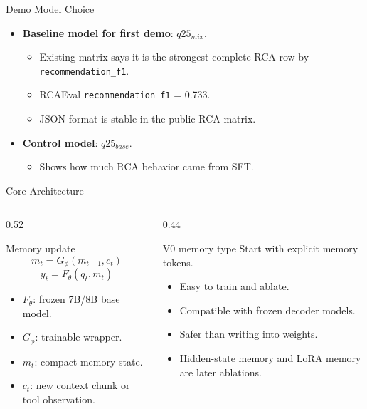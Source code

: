 \begin{frame}{Demo Model Choice}
  \begin{itemize}
    \item \textbf{Baseline model for first demo}: $q25_{mix}$.
      \begin{itemize}
        \item Existing matrix says it is the strongest complete RCA row by \texttt{recommendation\_f1}.
        \item RCAEval \texttt{recommendation\_f1} = 0.733.
        \item JSON format is stable in the public RCA matrix.
      \end{itemize}
    \item \textbf{Control model}: $q25_{base}$.
      \begin{itemize}
        \item Shows how much RCA behavior came from SFT.
      \end{itemize}
  \end{itemize}
\end{frame}

\begin{frame}{Core Architecture}
  \begin{columns}[T]
    \begin{column}{0.52\textwidth}
      \begin{block}{Memory update}
        \[
          m_t = G_\phi(m_{t-1}, c_t)
        \]
        \[
          y_t = F_\theta(q_t, m_t)
        \]
      \end{block}
      \begin{itemize}
        \item $F_\theta$: frozen 7B/8B base model.
        \item $G_\phi$: trainable wrapper.
        \item $m_t$: compact memory state.
        \item $c_t$: new context chunk or tool observation.
      \end{itemize}
    \end{column}
    \begin{column}{0.44\textwidth}
      \begin{block}{V0 memory type}
        Start with explicit memory tokens.
      \end{block}
      \begin{itemize}
        \item Easy to train and ablate.
        \item Compatible with frozen decoder models.
        \item Safer than writing into weights.
        \item Hidden-state memory and LoRA memory are later ablations.
      \end{itemize}
    \end{column}
  \end{columns}
\end{frame}

